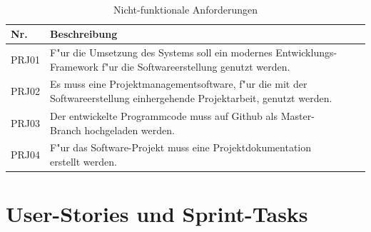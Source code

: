 \documentclass[a4paper, 11pt]{scrreprt}
\begin{document}
\begin{table}[H]

\caption{Nicht-funktionale Anforderungen}

\ \\

\par

\label{tab:Tabelle1}

\centering

\begin{tabular}{|p{2.5cm} p{12cm}| ll}

\hline
Nr. &	Beschreibung\\

\hline
PRJ01 &	F"ur die Umsetzung des Systems soll ein modernes Entwicklungs-Framework f"ur die Softwareerstellung genutzt werden.\\

\hline
PRJ02 &	Es muss eine Projektmanagementsoftware, f"ur die mit der Softwareerstellung einhergehende Projektarbeit, genutzt werden.\\

\hline
PRJ03 &	Der entwickelte Programmcode muss auf Github als Master-Branch hochgeladen werden.\\

\hline
PRJ04 &	F"ur das Software-Projekt muss eine Projektdokumentation erstellt werden.\\

\hline
\end{tabular}

\end{table}

\section{User-Stories und Sprint-Tasks}
\end{document}
